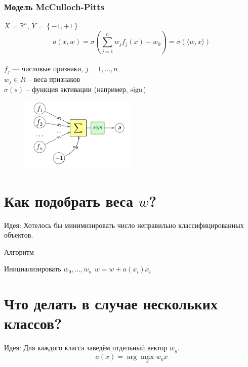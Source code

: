 \documentclass[10pt]{beamer}
\begin{document}
\begin{frame}\frametitle{Модель McCulloch-Pitts}
  $X = \mathbb{R}^n$, ${Y = \left\{ -1, + 1\right\}}$\\
	\pause
	$$a(x,w) = \sigma(\sum\limits_{j=1}^n w_j f_j(x) - w_0) = \sigma(\langle w, x \rangle)$$\\
  $f_j$ — числовые признаки, $j = 1,\dots, n$ \\	
	$w_j \in R$ -- веса признаков\\
	$\sigma(s)$ -- функция активации (например, $\operatorname{sign}$)
	\pause
	\begin{figure}[htbp]
	  \includegraphics[height=100pt, keepaspectratio = true]{images/neuron-scheme}   
	\end{figure}
\end{frame}

\section{Как подобрать веса $w$?}

\begin{frame}
  \alert{Идея}: Хотелось бы минимизировать число неправильно классифицированных объектов.
\end{frame}

\begin{frame}{Алгоритм}
	\begin{algorithmic}[1]
            \State Инициализировать ${w_0, \dots, w_n}$
                   \State $w = w + a(x_i) x_i$
                 \EndIf  
               \EndFor
           	\EndRepeat
        \EndFunction
    \end{algorithmic}
\end{frame}

\section{Что делать в случае нескольких классов?}

\begin{frame}
  \alert{Идея}: Для каждого класса заведём отдельный вектор $w_y$.
  \bigbreak \pause
  $$a(x) = \arg\max\limits_{y} w_y x $$
\end{frame}
\end{document}
